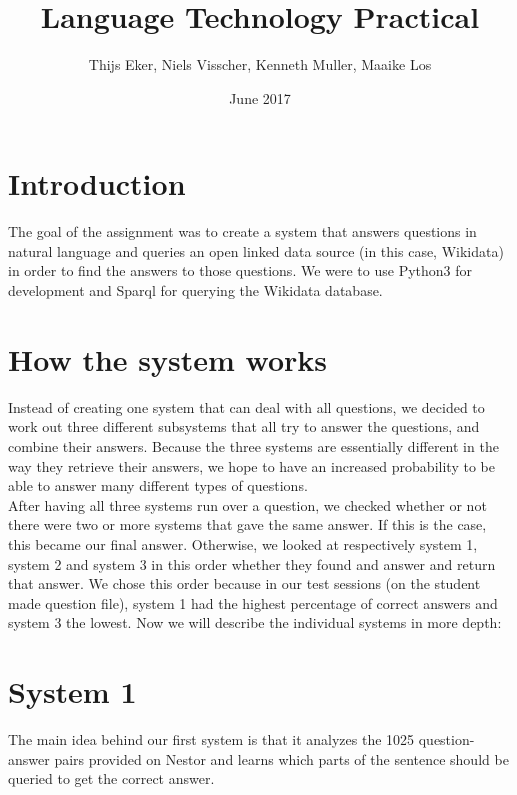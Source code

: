 \documentclass{article}
\title{Language Technology Practical}
\author{Thijs Eker, Niels Visscher, Kenneth Muller, Maaike Los }
\date{June 2017}
\begin{document}
\maketitle

\section{Introduction}

The goal of the assignment was to create a system that answers questions in natural language and queries an open linked data source (in this case, Wikidata) in order to find the answers to those questions. We were to use Python3 for development and Sparql for querying the Wikidata database.

\section{How the system works}
Instead of creating one system that can deal with all questions, we decided to work out three different subsystems that all try to answer the questions, and combine their answers. Because the three systems are essentially different in the way they retrieve their answers, we hope to have an increased probability to be able to answer many different types of questions. \\
After having all three systems run over a question, we checked whether or not there were two or more systems that gave the same answer. If this is the case, this became our final answer. Otherwise, we looked at respectively system 1, system 2 and system 3 in this order whether they found and answer and return that answer. We chose this order because in our test sessions (on the student made question file), system 1 had the highest percentage of correct answers and system 3 the lowest.
Now we will describe the individual systems in more depth:

\section*{System 1}
The main idea behind our first system is that it analyzes the 1025 question-answer pairs provided on Nestor and learns which parts of the sentence should be queried to get the correct answer.
\end{document}
